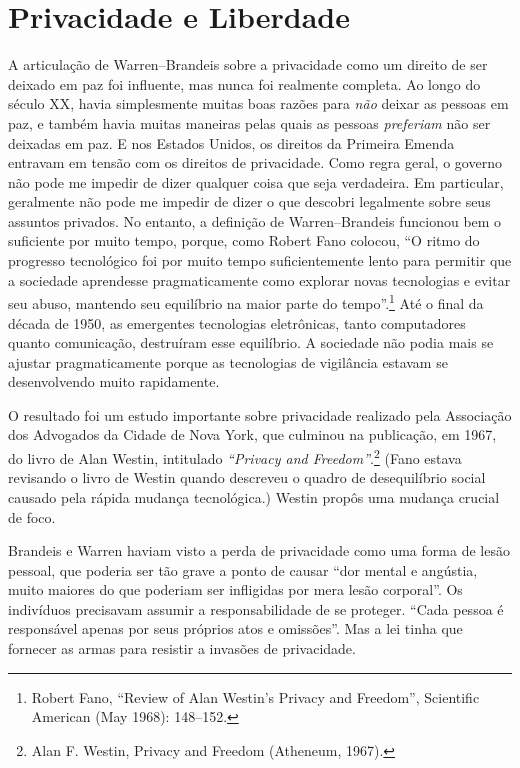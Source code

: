 \documentclass{book}
\newcommand{\ingles}[1]{\textit{#1}}
\begin{document}
\section{Privacidade e Liberdade}
\label{quem:privacidade}

A articulação de Warren--Brandeis sobre a privacidade como um direito de ser
deixado em paz foi influente, mas nunca foi realmente completa. Ao longo do
século XX, havia simplesmente muitas boas razões para \emph{não} deixar as pessoas
em paz, e também havia muitas maneiras pelas quais as pessoas \emph{preferiam} não
ser deixadas em paz. E nos Estados Unidos, os direitos da Primeira Emenda
entravam em tensão com os direitos de privacidade. Como regra geral, o governo
não pode me impedir de dizer qualquer coisa que seja verdadeira. Em particular,
geralmente não pode me impedir de dizer o que descobri legalmente sobre seus
assuntos privados. No entanto, a definição de Warren--Brandeis funcionou bem
o suficiente por muito tempo, porque, como Robert Fano colocou, ``O ritmo do
progresso tecnológico foi por muito tempo suficientemente lento para permitir
que a sociedade aprendesse pragmaticamente como explorar novas tecnologias e
evitar seu abuso, mantendo seu equilíbrio na maior parte do tempo''.\footnote{Robert
Fano, ``Review of Alan Westin’s Privacy and Freedom'', Scientific American
(May 1968): 148–152.} Até o final da década de 1950, as emergentes tecnologias
eletrônicas, tanto computadores quanto comunicação, destruíram esse equilíbrio.
A sociedade não podia mais se ajustar pragmaticamente porque as tecnologias de
vigilância estavam se desenvolvendo muito rapidamente.

O resultado foi um estudo importante sobre privacidade realizado pela Associação
dos Advogados da Cidade de Nova York, que culminou na publicação, em 1967, do
livro de Alan Westin, intitulado \ingles{``Privacy and Freedom''}.\footnote{
Alan F. Westin, Privacy and Freedom (Atheneum, 1967).} (Fano estava
revisando o livro de Westin quando descreveu o quadro de desequilíbrio social
causado pela rápida mudança tecnológica.) Westin propôs uma mudança crucial de foco.

Brandeis e Warren haviam visto a perda de privacidade como uma forma de lesão
pessoal, que poderia ser tão grave a ponto de causar ``dor mental e angústia,
muito maiores do que poderiam ser infligidas por mera lesão corporal''. Os
indivíduos precisavam assumir a responsabilidade de se proteger. ``Cada pessoa
é responsável apenas por seus próprios atos e omissões''. Mas a lei tinha que
fornecer as armas para resistir a invasões de privacidade.
\end{document}
